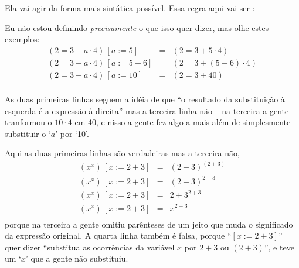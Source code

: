\documentclass[oneside,12pt]{article}
\begin{document}
{{Ela vai agir da forma mais sintática possível. Essa regra aqui vai ser
:

\begin{center}
\end{center}

Eu não estou definindo {\sl precisamente} o que isso quer dizer, mas
olhe estes exemplos:
%
$$\begin{array}{rcl}
  (2 = 3 + a·4) \, [a:=5]   &=& (2 = 3 + 5·4) \\
  (2 = 3 + a·4) \, [a:=5+6] &=& (2 = 3 + (5+6)·4) \\
  (2 = 3 + a·4) \, [a:=10]  &=& (2 = 3 + 40) \\
  \end{array}
$$

As duas primeiras linhas seguem a idéia de que ``o resultado da
substituição à esquerda é a expressão à direita'' mas a terceira linha
não -- na terceira a gente tranformou o $10·4$ em 40, e nisso a gente
fez algo a mais além de simplesmente substituir o `$a$' por `10'. 

Aqui as duas primeiras linhas são verdadeiras mas a terceira não,
%
$$\begin{array}{rcl}
          (x^x) \, [x:=2+3] &=& (2+3)^{(2+3)} \\
          (x^x) \, [x:=2+3] &=& (2+3)^{2+3} \\
          (x^x) \, [x:=2+3] &=& 2+3^{2+3} \\
          (x^x) \, [x:=2+3] &=& x^{2+3} \\
  \end{array}
$$
%
porque na terceira a gente omitiu parênteses de um jeito que muda o
significado da expressão original. A quarta linha também é falsa,
porque ``$[x:=2+3]$'' quer dizer ``substitua  as
ocorrências da variável $x$ por $2+3$ ou $(2+3)$'', e teve um `$x$'
que a gente não substituiu.

}}




\newpage
\end{document}

